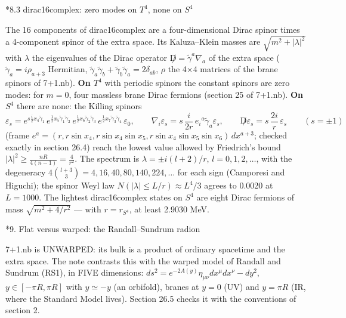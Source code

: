 \documentclass[10pt,a4paper]{article}
\makeatletter
\renewcommand\section{\@startsection{section}{1}{\z@}{-3.5ex \@plus -1ex \@minus -.2ex}{2.3ex \@plus.2ex}{\normalfont\Large\bfseries\raggedright}}
\renewcommand\subsection{\@startsection{subsection}{2}{\z@}{-3.25ex\@plus -1ex \@minus -.2ex}{1.5ex \@plus .2ex}{\normalfont\large\bfseries\raggedright}}
\makeatother
\begin{document}
\subsection*{8.3 dirac16complex: zero modes on \texorpdfstring{$T^4$}{T4}, none on \texorpdfstring{$S^4$}{S4}}
The 16 components of dirac16complex are a four-dimensional Dirac spinor times a 4-component spinor of the extra space. Its Kaluza–Klein masses are $\sqrt{m^2+|\lambda|^2}$ with $\lambda$ the eigenvalues of the Dirac operator $\not D=\tilde\gamma^a\nabla_a$ of the extra space ($\tilde\gamma_a=i\rho_{a+3}$ Hermitian, $\tilde\gamma_a\tilde\gamma_b+\tilde\gamma_b\tilde\gamma_a=2\delta_{ab}$, $\rho$ the 4×4 matrices of the brane spinors of 7+1.nb). \textbf{On $T^4$} with periodic spinors the constant spinors are zero modes: for $m=0$, four massless brane Dirac fermions (section 25 of 7+1.nb). \textbf{On $S^4$} there are none: the Killing spinors
\begin{equation*}
\varepsilon_s=e^{s\frac i2x_4\tilde\gamma_1}\,e^{\frac12x_5\tilde\gamma_1\tilde\gamma_2}\,e^{\frac12x_6\tilde\gamma_2\tilde\gamma_3}\,e^{\frac12x_7\tilde\gamma_3\tilde\gamma_4}\,\varepsilon_0,\qquad \nabla_i\varepsilon_s=s\,\frac i{2r}\,e_i{}^a\tilde\gamma_a\varepsilon_s,\qquad \not D\varepsilon_s=s\,\frac{2i}r\,\varepsilon_s\qquad(s=\pm1)
\end{equation*}
(frame $e^a=(r,r\sin x_4,r\sin x_4\sin x_5,r\sin x_4\sin x_5\sin x_6)\,dx^{a+3}$; checked exactly in section 26.4) reach the lowest value allowed by Friedrich’s bound $|\lambda|^2\ge\frac{nR}{4(n-1)}=\frac4{r^2}$. The spectrum is $\lambda=\pm i(l+2)/r$, $l=0,1,2,\dots$, with the degeneracy $4\binom{l+3}3=4,16,40,80,140,224,\dots$ for each sign (Camporesi and Higuchi); the spinor Weyl law $N(|\lambda|\le L/r)\approx L^4/3$ agrees to 0.0020 at $L=1000$. The lightest dirac16complex states on $S^4$ are eight Dirac fermions of mass $\sqrt{m^2+4/r^2}$ — with $r=r_{S^4}$, at least 2.9030 MeV.

\section*{9. Flat versus warped: the Randall–Sundrum radion}
7+1.nb is UNWARPED: its bulk is a product of ordinary spacetime and the extra space. The note contrasts this with the warped model of Randall and Sundrum (RS1), in FIVE dimensions: $ds^2=e^{-2A(y)}\eta_{\mu\nu}dx^\mu dx^\nu-dy^2$, $y\in[-\pi R,\pi R]$ with $y\simeq-y$ (an orbifold), branes at $y=0$ (UV) and $y=\pi R$ (IR, where the Standard Model lives). Section 26.5 checks it with the conventions of section 2.
\end{document}
